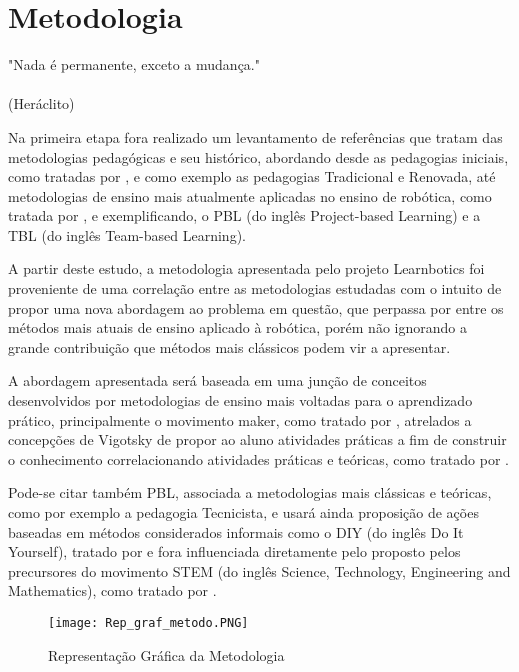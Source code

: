 \chapter{Metodologia}
\label{chap:meto}
\begin{flushright}
	"Nada é permanente, exceto a mudança." \\
	\ \\
	(Heráclito)
\end{flushright}

Na primeira etapa fora realizado um levantamento de referências que tratam das metodologias pedagógicas e seu histórico, abordando desde as pedagogias iniciais, como tratadas por \cite{larchert}, e como exemplo as pedagogias Tradicional e Renovada, até metodologias de ensino mais atualmente aplicadas no ensino de robótica, como tratada por \cite{dillenbourg}, e exemplificando, o PBL (do inglês Project-based Learning) e a TBL (do inglês Team-based Learning).

A partir deste estudo, a metodologia apresentada pelo projeto Learnbotics foi proveniente de uma correlação entre as metodologias estudadas com o intuito de propor uma nova abordagem ao problema em questão, que perpassa por entre os métodos mais atuais de ensino aplicado à robótica, porém não ignorando a grande
contribuição que métodos mais clássicos podem vir a apresentar.

A abordagem apresentada será baseada em uma junção de conceitos desenvolvidos por metodologias de ensino mais voltadas para o aprendizado prático, principalmente o movimento maker, como tratado por \cite{dillenbourg}, atrelados a concepções de Vigotsky de propor ao aluno atividades práticas a fim de construir o conhecimento correlacionando atividades práticas e teóricas, como tratado por \cite{Palangana}.

Pode-se citar também PBL, associada a metodologias mais clássicas e teóricas, como por exemplo a pedagogia Tecnicista, e usará ainda proposição de ações baseadas em métodos considerados informais como o DIY (do inglês Do It Yourself), tratado por \cite{wolf} e fora influenciada diretamente pelo proposto pelos precursores do movimento STEM (do inglês Science, Technology, Engineering and Mathematics), como tratado por \cite{Pugliese}.

\begin{figure}[h!]												
	\centering		
	\texttt{[image: Rep\_graf\_metodo.PNG]}			
	\caption{Representação Gráfica da Metodologia}		
	\label{img:rep_metod}	
\end{figure}


